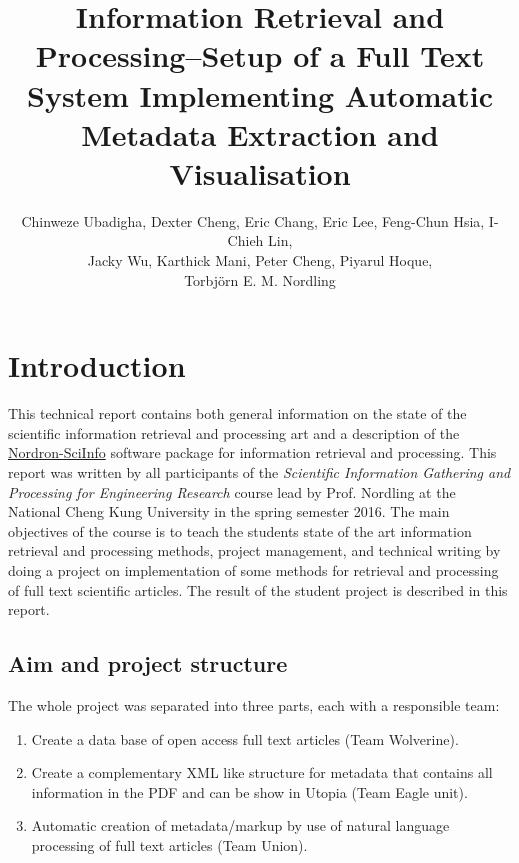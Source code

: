 \documentclass[a4paper,twocolumn,twoside]{article}
\begin{document}
 
	
	\title{Information Retrieval and Processing--Setup of a Full Text System Implementing Automatic Metadata Extraction and Visualisation}
	\author{Chinweze Ubadigha, Dexter Cheng, Eric Chang, Eric Lee, Feng-Chun Hsia, I-Chieh Lin, \\Jacky Wu,  Karthick Mani, Peter Cheng, Piyarul Hoque,\\ Torbjörn E. M. Nordling}  %
	\maketitle   
	
	\section{Introduction}
	\label{Introduction}
	
	This technical report contains both general information on the state of the scientific information retrieval and processing art and a description of the \href{https://bitbucket.org/nordron/nordron-sciinfo}{Nordron-SciInfo} software package for information retrieval and processing. 
	This report was written by all participants of the \emph{Scientific Information Gathering and Processing for Engineering Research} course lead by Prof. Nordling at the National Cheng Kung University in the spring semester 2016. The main objectives of the course is to teach the students state of the art information retrieval and processing methods, project management, and technical writing by doing a project on implementation of some methods for retrieval and processing of full text scientific articles. The result of the student project is described in this report.
	
	\subsection{Aim and project structure}
	\label{aim}

	The whole project was separated into three parts, each with a responsible team:
	\begin{enumerate}
		\item Create a data base of open access full text articles (Team Wolverine).
		\item Create a complementary XML like structure for metadata that contains all information in the PDF and can be show in Utopia (Team Eagle unit).
		\item Automatic creation of metadata/markup by use of natural language processing of full text articles (Team Union).
	\end{enumerate}
	
\end{document}
